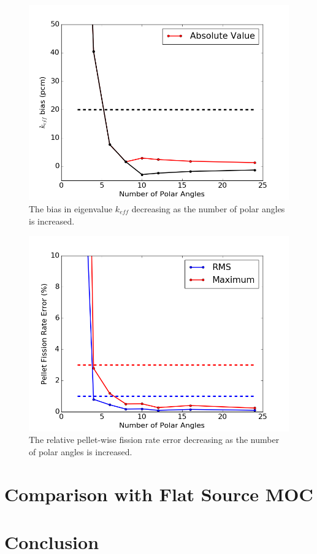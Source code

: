 \begin{figure}[h!]
	\centering
	\includegraphics[width=0.7\linewidth]{figures/results/sensitivity/rodded_polar_angles_pcm.png}
	\caption[]{The bias in eigenvalue $k_{\textit{eff}}$ decreasing as the number of polar angles is increased.}
	\label{fig:rodded-polar-angles-pcm}
\end{figure}
\begin{figure}[h!]
	\centering
	\includegraphics[width=0.7\linewidth]{figures/results/sensitivity/rodded_polar_angles_fr.png}
	\caption[]{The relative pellet-wise fission rate error decreasing as the number of polar angles is increased.}
	\label{fig:rodded-polar-angles-fr}
\end{figure}

\section{Comparison with Flat Source MOC}
\label{sec:flat-linear-comparision}


\section{Conclusion}
\label{sec:sensitivity-conclusion}

